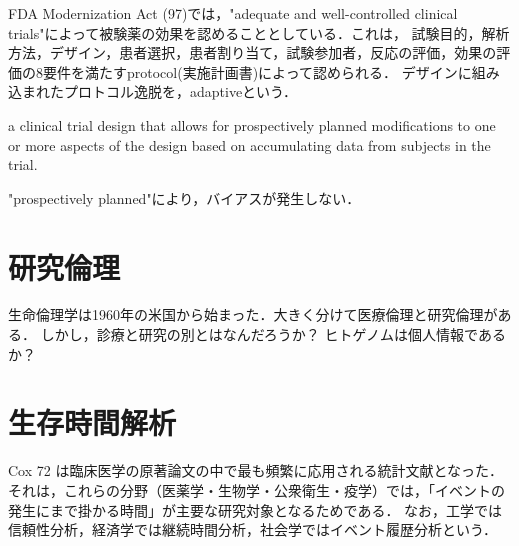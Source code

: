 \documentclass[uplatex,dvipdfmx]{jsreport}
\begin{document}
\begin{history}
    FDA Modernization Act (97)では，"adequate and well-controlled  clinical trials"によって被験薬の効果を認めることとしている．これは，
    試験目的，解析方法，デザイン，患者選択，患者割り当て，試験参加者，反応の評価，効果の評価の8要件を満たすprotocol(実施計画書)によって認められる．
    デザインに組み込まれたプロトコル逸脱を，adaptiveという．
\end{history}

\begin{definition}
    a clinical trial design that
    allows for prospectively planned modifications to one or more aspects of the design based on
    accumulating data from subjects in the trial.
\end{definition}
\begin{remark}
    "prospectively planned"により，バイアスが発生しない．
\end{remark}

\section{研究倫理}

\begin{tcolorbox}[colframe=ForestGreen, colback=ForestGreen!10!white,breakable,colbacktitle=ForestGreen!40!white,coltitle=black,fonttitle=\bfseries\sffamily,
title=]
    生命倫理学は1960年の米国から始まった．大きく分けて医療倫理と研究倫理がある．
    しかし，診療と研究の別とはなんだろうか？
    ヒトゲノムは個人情報であるか？
\end{tcolorbox}

\section{生存時間解析}

\begin{tcolorbox}[colframe=ForestGreen, colback=ForestGreen!10!white,breakable,colbacktitle=ForestGreen!40!white,coltitle=black,fonttitle=\bfseries\sffamily,
title=]
    Cox 72 は臨床医学の原著論文の中で最も頻繁に応用される統計文献となった．
    それは，これらの分野（医薬学・生物学・公衆衛生・疫学）では，「イベントの発生にまで掛かる時間」が主要な研究対象となるためである．
    なお，工学では信頼性分析，経済学では継続時間分析，社会学ではイベント履歴分析という．
\end{tcolorbox}
\end{document}
